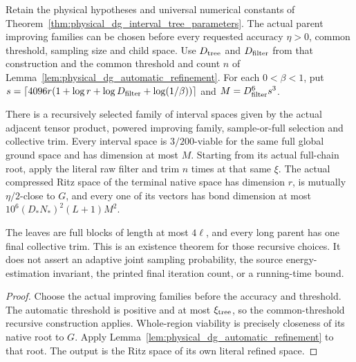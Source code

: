 \begin{lemma}
    \label{lem:physical_dg_tree_ritz_approximation}
    \leanok
    Retain the physical hypotheses and universal numerical constants of
    Theorem~\ref{thm:physical_dg_interval_tree_parameters}. The actual
    parent improving families can be chosen before every requested
    accuracy $\eta>0$, common threshold, sampling size and child space.
    Use $D_{\rm tree}$ and $D_{\rm filter}$ from that construction and
    the common threshold and count $n$ of
    Lemma~\ref{lem:physical_dg_automatic_refinement}. For each
    $0<\beta<1$, put
    $s=\lceil4096r(1+\log r+\log D_{\rm filter}+\log(1/\beta))\rceil$
    and $M=D_{\rm filter}^6s^3$.

    There is a recursively selected family of interval spaces given by
    the actual adjacent tensor product, powered improving family,
    sample-or-full selection and collective trim. Every interval space
    is $3/200$-viable for the same full global ground space and has
    dimension at most $M$. Starting from its actual full-chain root,
    apply the literal raw filter and trim $n$ times at that same $\xi$.
    The actual compressed Ritz space of the terminal native space has
    dimension $r$, is mutually $\eta/2$-close to $G$, and every one of
    its vectors has bond dimension at most
    $10^6(D_*N_*)^2(L+1)M^2$.

    The leaves are full blocks of length at most $4\ell$, and every
    long parent has one final collective trim. This is an existence
    theorem for those recursive choices. It does not assert an adaptive
    joint sampling probability, the source energy-estimation invariant,
    the printed final iteration count, or a running-time bound.
\end{lemma}
\begin{proof}\leanok
    Choose the actual improving families before the accuracy and
    threshold. The automatic threshold is positive and at most
    $\xi_{\rm tree}$, so the common-threshold recursive construction
    applies. Whole-region viability is precisely closeness of its native
    root to $G$. Apply
    Lemma~\ref{lem:physical_dg_automatic_refinement} to that root.
    The output is the Ritz space of its own literal refined space.
\end{proof}

